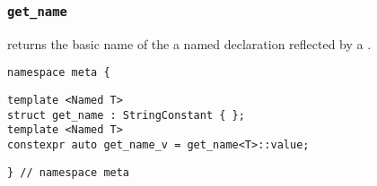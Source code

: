 
\subsubsection{\texttt{get\_name}}

returns the basic name of the a named declaration reflected by a .

\begin{verbatim}
namespace meta {
\end{verbatim}
\begin{verbatim}
template <Named T>
struct get_name : StringConstant { };
template <Named T>
constexpr auto get_name_v = get_name<T>::value;
\end{verbatim}
\begin{verbatim}
} // namespace meta
\end{verbatim}
